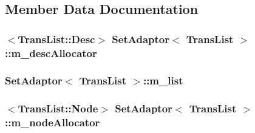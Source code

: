 \subsection{Member Data Documentation}
\hypertarget{classSetAdaptor_3_01TransList_01_4_a6bfa19fd452930554f066777ab98465f}{
\subsubsection[{m\-\_\-desc\-Allocator}]{$<${\bf Trans\-List\-::\-Desc}$>$ {\bf Set\-Adaptor}$<$ {\bf Trans\-List} $>$\-::m\-\_\-desc\-Allocator\hspace{0.3cm}{\ttfamily [private]}}}\label{classSetAdaptor_3_01TransList_01_4_a6bfa19fd452930554f066777ab98465f}
\hypertarget{classSetAdaptor_3_01TransList_01_4_a4a214a269931e33781cc694a83e5e910}{
\subsubsection[{m\-\_\-list}]{ {\bf Set\-Adaptor}$<$ {\bf Trans\-List} $>$\-::m\-\_\-list\hspace{0.3cm}{\ttfamily [private]}}}\label{classSetAdaptor_3_01TransList_01_4_a4a214a269931e33781cc694a83e5e910}
\hypertarget{classSetAdaptor_3_01TransList_01_4_a01051805f279a3cbc56346a2f9b4b8fd}{
\subsubsection[{m\-\_\-node\-Allocator}]{$<${\bf Trans\-List\-::\-Node}$>$ {\bf Set\-Adaptor}$<$ {\bf Trans\-List} $>$\-::m\-\_\-node\-Allocator\hspace{0.3cm}{\ttfamily [private]}}}\label{classSetAdaptor_3_01TransList_01_4_a01051805f279a3cbc56346a2f9b4b8fd}
